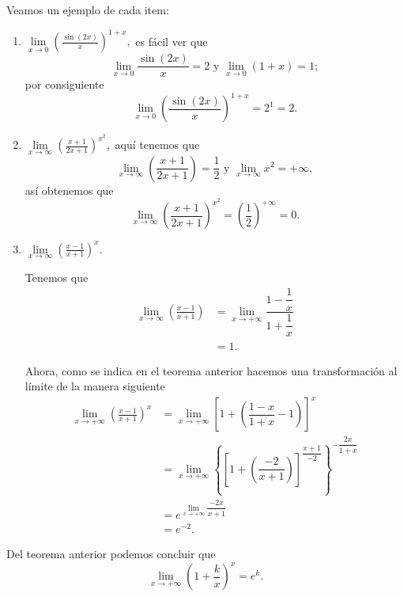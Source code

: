 Veamos un ejemplo de cada item:
\begin{enumerate}
	\item \(\lim\limits_{x\to 0}\left(\frac{\sin(2x)}{x}\right)^{1+x},\) es f\'acil ver que
	\[
	\lim\limits_{x\to 0}\dfrac{\sin(2x)}{x}=2\text{ y }\lim\limits_{x\to 0}\left(1+x\right)=1;
	\]
	por consiguiente 
	\[
	\lim\limits_{x\to 0}\left(\dfrac{\sin(2x)}{x}\right)^{1+x}=2^1=2.
	\]
	
	\item \(\lim\limits_{x\to \infty}\left(\frac{x+1}{2x+1}\right)^{x^2},\) aqu\'i tenemos que
	\[
	\lim\limits_{x\to \infty}\left(\frac{x+1}{2x+1}\right)=\dfrac{1}{2}\text{ y }\lim\limits_{x\to\infty}x^2=+\infty,
	\]
	as\'i obtenemos que
	\[
	\lim\limits_{x\to \infty}\left(\frac{x+1}{2x+1}\right)^{x^2}=\left(\dfrac{1}{2}\right)^{+\infty}=0.
	\]
	
	\item \(\lim\limits_{x\to\infty}\left(\frac{x-1}{x+1}\right)^x.\) \newline
	
	Tenemos que
	\begin{align*}
		\lim\limits_{x\to\infty}\left(\frac{x-1}{x+1}\right)&=\lim\limits_{x\to+\infty}\dfrac{1-\dfrac{1}{x}}{1+\dfrac{1}{x}}\\
		&=1.
	\end{align*}
	
	Ahora, como se indica en el teorema anterior hacemos una transformaci\'on al l\'imite de la manera siguiente
	\begin{align*}
	\lim\limits_{x\to+\infty}\left(\frac{x-1}{x+1}\right)^x&=\lim\limits_{x\to+\infty}\left[1+\left(\dfrac{1-x}{1+x}-1\right)\right]^x\\
	&=\lim\limits_{x\to+\infty}\left\{\left[1+\left(\dfrac{-2}{x+1}\right)\right]^{\dfrac{x+1}{-2}}\right\}^{-\dfrac{2x}{1+x}}\\
	&=e^{\lim\limits_{x\to+\infty}\dfrac{-2x}{x+1}}\\
	&=e^{-2}.
	\end{align*}
\end{enumerate}


%
Del teorema anterior  podemos concluir que
\[
\lim\limits_{x\to+\infty}\left(1+\frac{k}{x}\right)^x=e^k.
\]


